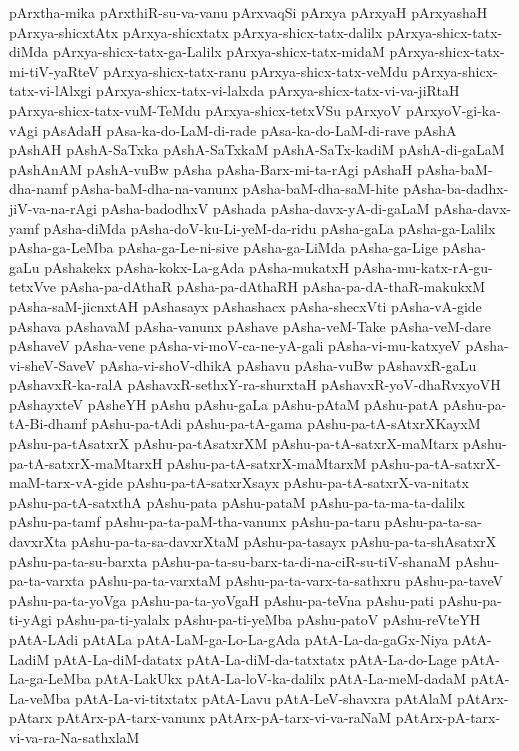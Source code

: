{pArxtha-mika
pArxthiR-su-va-vanu
pArxvaqSi
pArxya
pArxyaH
pArxyashaH
pArxya-shicxtAtx
pArxya-shicxtatx
pArxya-shicx-tatx-dalilx
pArxya-shicx-tatx-diMda
pArxya-shicx-tatx-ga-Lalilx
pArxya-shicx-tatx-midaM
pArxya-shicx-tatx-mi-tiV-yaRteV
pArxya-shicx-tatx-ranu
pArxya-shicx-tatx-veMdu
pArxya-shicx-tatx-vi-lAlxgi
pArxya-shicx-tatx-vi-lalxda
pArxya-shicx-tatx-vi-va-jiRtaH
pArxya-shicx-tatx-vuM-TeMdu
pArxya-shicx-tetxVSu
pArxyoV
pArxyoV-gi-ka-vAgi
pAsAdaH
pAsa-ka-do-LaM-di-rade
pAsa-ka-do-LaM-di-rave
pAshA
pAshAH
pAshA-SaTxka
pAshA-SaTxkaM
pAshA-SaTx-kadiM
pAshA-di-gaLaM
pAshAnAM
pAshA-vuBw
pAsha
pAsha-Barx-mi-ta-rAgi
pAshaH
pAsha-baM-dha-namf
pAsha-baM-dha-na-vanunx
pAsha-baM-dha-saM-hite
pAsha-ba-dadhx-jiV-va-na-rAgi
pAsha-badodhxV
pAshada
pAsha-davx-yA-di-gaLaM
pAsha-davx-yamf
pAsha-diMda
pAsha-doV-ku-Li-yeM-da-ridu
pAsha-gaLa
pAsha-ga-Lalilx
pAsha-ga-LeMba
pAsha-ga-Le-ni-sive
pAsha-ga-LiMda
pAsha-ga-Lige
pAsha-gaLu
pAshakekx
pAsha-kokx-La-gAda
pAsha-mukatxH
pAsha-mu-katx-rA-gu-tetxVve
pAsha-pa-dAthaR
pAsha-pa-dAthaRH
pAsha-pa-dA-thaR-makukxM
pAsha-saM-jicnxtAH
pAshasayx
pAshashacx
pAsha-shecxVti
pAsha-vA-gide
pAshava
pAshavaM
pAsha-vanunx
pAshave
pAsha-veM-Take
pAsha-veM-dare
pAshaveV
pAsha-vene
pAsha-vi-moV-ca-ne-yA-gali
pAsha-vi-mu-katxyeV
pAsha-vi-sheV-SaveV
pAsha-vi-shoV-dhikA
pAshavu
pAsha-vuBw
pAshavxR-gaLu
pAshavxR-ka-ralA
pAshavxR-sethxY-ra-shurxtaH
pAshavxR-yoV-dhaRvxyoVH
pAshayxteV
pAsheYH
pAshu
pAshu-gaLa
pAshu-pAtaM
pAshu-patA
pAshu-pa-tA-Bi-dhamf
pAshu-pa-tAdi
pAshu-pa-tA-gama
pAshu-pa-tA-sAtxrXKayxM
pAshu-pa-tAsatxrX
pAshu-pa-tAsatxrXM
pAshu-pa-tA-satxrX-maMtarx
pAshu-pa-tA-satxrX-maMtarxH
pAshu-pa-tA-satxrX-maMtarxM
pAshu-pa-tA-satxrX-maM-tarx-vA-gide
pAshu-pa-tA-satxrXsayx
pAshu-pa-tA-satxrX-va-nitatx
pAshu-pa-tA-satxthA
pAshu-pata
pAshu-pataM
pAshu-pa-ta-ma-ta-dalilx
pAshu-pa-tamf
pAshu-pa-ta-paM-tha-vanunx
pAshu-pa-taru
pAshu-pa-ta-sa-davxrXta
pAshu-pa-ta-sa-davxrXtaM
pAshu-pa-tasayx
pAshu-pa-ta-shAsatxrX
pAshu-pa-ta-su-barxta
pAshu-pa-ta-su-barx-ta-di-na-ciR-su-tiV-shanaM
pAshu-pa-ta-varxta
pAshu-pa-ta-varxtaM
pAshu-pa-ta-varx-ta-sathxru
pAshu-pa-taveV
pAshu-pa-ta-yoVga
pAshu-pa-ta-yoVgaH
pAshu-pa-teVna
pAshu-pati
pAshu-pa-ti-yAgi
pAshu-pa-ti-yalalx
pAshu-pa-ti-yeMba
pAshu-patoV
pAshu-reVteYH
pAtA-LAdi
pAtALa
pAtA-LaM-ga-Lo-La-gAda
pAtA-La-da-gaGx-Niya
pAtA-LadiM
pAtA-La-diM-datatx
pAtA-La-diM-da-tatxtatx
pAtA-La-do-Lage
pAtA-La-ga-LeMba
pAtA-LakUkx
pAtA-La-loV-ka-dalilx
pAtA-La-meM-dadaM
pAtA-La-veMba
pAtA-La-vi-titxtatx
pAtA-Lavu
pAtA-LeV-shavxra
pAtAlaM
pAtArx-pAtarx
pAtArx-pA-tarx-vanunx
pAtArx-pA-tarx-vi-va-raNaM
pAtArx-pA-tarx-vi-va-ra-Na-sathxlaM
}

